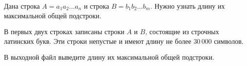 Дана строка $A = a_1a_2 \ldots a_n$ и строка $B = b_1b_2 \ldots b_m$. Нужно узнать длину их максимальной общей подстроки.
 
\InputFile

В первых двух строках записаны строки $A$ и $B$, состоящие из строчных латинских букв.
Эти строки непустые и имеют длину не более $30\,000$ символов.

\OutputFile
В выходной файл выведите длину их максимальной общей подстроки.
